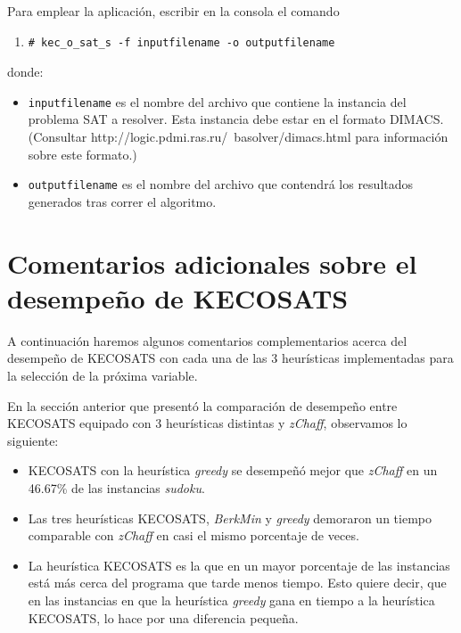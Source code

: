 \documentclass[12pt,lettersize,oneside]{article}
\begin{document}
Para emplear la aplicación, escribir en la consola el comando
\begin{enumerate}
\item \begin{lstlisting}[style=consola]
# kec_o_sat_s -f inputfilename -o outputfilename 
\end{lstlisting}
\end{enumerate}
\noindent donde:
\vspace{-2.5mm}
\begin{itemize}
\item {\tt inputfilename} es el nombre del archivo que contiene la instancia del
  problema SAT a resolver. Esta instancia debe estar en el formato DIMACS.
(Consultar http://logic.pdmi.ras.ru/~basolver/dimacs.html para información sobre
este formato.)
\item {\tt outputfilename} es el nombre del archivo que contendrá los resultados
  generados tras correr el algoritmo.
\end{itemize}


\section{Comentarios adicionales sobre el desempeño de KECOSATS}

A continuación haremos algunos comentarios complementarios acerca del desempeño
de KECOSATS con cada una de las 3 heurísticas implementadas para la selección de
la próxima variable.

 En la sección anterior que presentó la comparación de desempeño entre
  KECOSATS equipado con 3 heurísticas distintas y \emph{zChaff}, observamos
  lo siguiente:\vspace{-2.5mm}
\begin{itemize}
\item KECOSATS con la heurística \emph{greedy} se desempeñó mejor que
  \emph{zChaff} en un 46.67\% de las instancias \emph{sudoku}.
 \item Las tres heurísticas KECOSATS, \emph{BerkMin} y \emph{greedy} demoraron
   un tiempo comparable con \emph{zChaff} en casi el mismo porcentaje de veces.
\item La heurística KECOSATS es la que en un mayor porcentaje de las instancias
  está más cerca del programa que tarde menos tiempo. Esto quiere decir, que en
  las instancias en que la heurística \emph{greedy} gana en tiempo a la
  heurística KECOSATS, lo hace por una diferencia pequeña.
   
\end{itemize}
\end{document}
